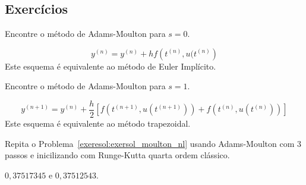 \subsection*{Exercícios}

\begin{exer}
Encontre o método de Adams-Moulton para $s=0$.
\end{exer}
\begin{resp}
 \begin{equation}
  y^{(n)}=y^{(n)}+hf\left(t^{(n)},u(t^{(n)}\right)
 \end{equation}
Este esquema é equivalente ao método de Euler Implícito.
 \end{resp}



\begin{exer}
Encontre o método de Adams-Moulton para $s=1$.
\end{exer}
\begin{resp}
 \begin{equation}
  y^{(n+1)}=y^{(n)}+\frac{h}{2}\left[f\left(t^{(n+1)},u(t^{(n+1)})\right)+f\left(t^{(n)},u(t^{(n)})\right)\right]
 \end{equation}
 Este esquema é equivalente ao método trapezoidal.
 \end{resp}


 \begin{exer} Repita o Problema~\ref{exeresol:exersol_moulton_nl} usando Adams-Moulton com 3 passos e inicilizando com Runge-Kutta quarta ordem clássico.
  \end{exer}
\begin{resp}
 $0,37517345$ e  $0,37512543$.
\end{resp}


